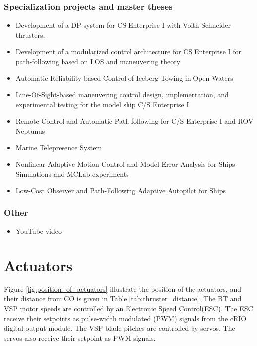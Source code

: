 \subsubsection{Specialization projects and master theses}
\begin{itemize}
	\item Development of a DP system for CS Enterprise I with Voith Schneider thrusters. \citep{Skaatun2011}
	\item Development of a modularized control architecture for CS Enterprise I for path-following based on LOS and maneuvering theory \citep{Tran2013}
	\item Automatic Reliability-based Control of Iceberg Towing in Open Waters \citep{Orsten2014}
	\item Line-Of-Sight-based maneuvering control design, implementation, and experimental testing for the model ship C/S Enterprise I.\citep{Tran2014}
	\item Remote Control and Automatic Path-following for C/S Enterprise I and ROV Neptunus \citep{Sandved2015}
	\item Marine Telepresence System \citep{Valle2015}
	\item Nonlinear Adaptive Motion Control and Model-Error Analysis for Ships-Simulations and MCLab experiments \citep{bjorne2016nonlinear}
	\item Low-Cost Observer and Path-Following Adaptive Autopilot for Ships \citep{mykland2017}
\end{itemize}
\subsubsection{Other}
\begin{itemize}
	\item YouTube video \citep{Skaatun2014}
\end{itemize}

\section{Actuators}
Figure \ref{fig:position_of_actuators} illustrate the position of the actuators, and their distance from CO is given in Table \ref{tab:thruster_distance}. The BT and VSP motor speeds are controlled by an Electronic Speed Control(ESC). The ESC receive their setpoints as pulse-width modulated (PWM) signals from the cRIO digital output module. The VSP blade pitches are controlled by servos. The servos also receive their setpoint as PWM signals.

